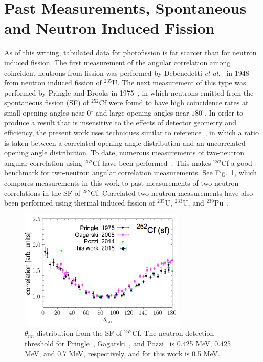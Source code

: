 \section{Past Measurements, Spontaneous and Neutron Induced Fission}
As of this writing, tabulated data for photofission is far scarcer than for neutron induced fission.
The first measurement of the angular correlation among coincident neutrons from fission was performed by Debenedetti \emph{et al.}~\cite{1948twoNCorr} in 1948 from neutron induced fission of $^{235}\text{U}$.
The next measurement of this type was performed by Pringle and Brooks in 1975~\cite{1975Cf252}, in which neutrons emitted from the spontaneous fission (SF) of $^{252}$Cf were found to have high coincidence rates at small opening angles near 0$^{\circ}$ and large opening angles near $180^{\circ}$.
In order to produce a result that is insensitive to the effects of detector geometry and efficiency, the present work uses techniques similar to reference~\cite{1975Cf252}, in which a ratio is taken between a correlated opening angle distribution and an uncorrelated opening angle distribution.
To date, numerous measurements of two-neutron angular correlation using $^{252}$Cf have been performed~\cite{Pozzi2014, 2008CF252, 1975Cf252}.
This makes $^{252}$Cf a good benchmark for two-neutron angular correlation measurements.
See Fig.~\ref{fig:Cf252_us_vs_them}, which compares measurements in this work to past measurements of two-neutron correlations in the SF of $^{252}$Cf.
Correlated two-neutron measurements have also been performed using thermal induced fission of $^{235}$U, $^{233}$U, and $^{239}$Pu~\cite{Sokolov2010}.
\begin{figure}[h]
\includegraphics[width=0.7\textwidth]{Content/Introduction/Cf252_us_vs_them.png}
\caption{$\theta_{nn}$ distribution from the SF of $^{252}$Cf.
 The neutron detection threshold for Pringle~\cite{1975Cf252}, Gagarski~\cite{2008CF252}, and Pozzi~\cite{Pozzi2016} is 0.425 MeV, 0.425 MeV, and 0.7 MeV, respectively, and for this work is 0.5 MeV.
}
\label{fig:Cf252_us_vs_them}
\end{figure}
